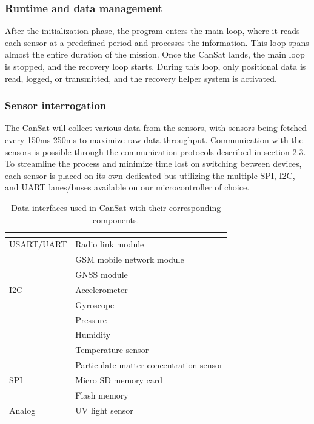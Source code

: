 \documentclass[11pt]{article}
\begin{document}
\subsubsection{Runtime and data management}
After the initialization phase, the program enters the main loop, where it reads each sensor at a predefined period and processes the information. This loop spans almost the entire duration of the mission. Once the CanSat lands, the main loop is stopped, and the recovery loop starts. During this loop, only positional data is read, logged, or transmitted, and the recovery helper system is activated.

\subsubsection{Sensor interrogation}
The CanSat will collect various data from the sensors, with sensors being fetched every 150ms-250ms to maximize raw data throughput. Communication with the sensors is possible through the communication protocols described in section 2.3. To streamline the process and minimize time lost on switching between devices, each sensor is placed on its own dedicated bus utilizing the multiple SPI, I2C, and UART lanes/buses available on our microcontroller of choice.

\begin{table}[ht]
\centering
{}
\begin{tabular}{ll}
\rowcolor{CDOSRPrimary}
\hline
\textbf{\color{white!50}{Data Interface}} & \textbf{\color{white!50}{Components}} \\ \hline
USART/UART & Radio link module \\
& GSM mobile network module\\
& GNSS module \\ 
\rowcolor{LightCyan1!50}I2C & Accelerometer \\
\rowcolor{LightCyan1!50}& Gyroscope\\
\rowcolor{LightCyan1!50}& Pressure\\
\rowcolor{LightCyan1!50}& Humidity \\
\rowcolor{LightCyan1!50}& Temperature sensor \\
\rowcolor{LightCyan1!50}& Particulate matter concentration sensor \\ 
SPI & Micro SD memory card \\
& Flash memory \\ 
\rowcolor{LightCyan1!50}Analog & UV light sensor \\ \hline
\end{tabular}
\caption{\small{Data interfaces used in CanSat with their corresponding components.}}
\label{tab:data-interfaces}
\end{table}
\end{document}
